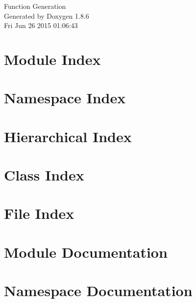 \documentclass[twoside]{book}
\newcommand{\clearemptydoublepage}{%
  \newpage{\pagestyle{empty}\cleardoublepage}%
}
\begin{document}
\hypersetup{pageanchor=false}
\begin{titlepage}
\vspace*{7cm}
\begin{center}%
{\Large Function Generation }\\
\vspace*{1cm}
{\large Generated by Doxygen 1.8.6}\\
\vspace*{0.5cm}
{\small Fri Jun 26 2015 01:06:43}\\
\end{center}
\end{titlepage}
\clearemptydoublepage
\tableofcontents
\clearemptydoublepage
{}
\hypersetup{pageanchor=true}

\chapter{Module Index}

\chapter{Namespace Index}

\chapter{Hierarchical Index}

\chapter{Class Index}

\chapter{File Index}

\chapter{Module Documentation}












\chapter{Namespace Documentation}





\end{document}
